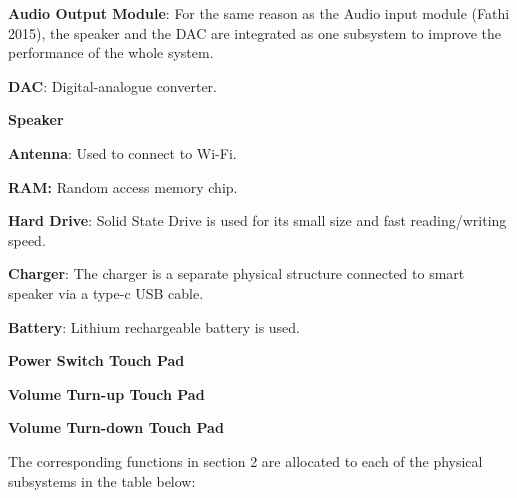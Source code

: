 \documentclass{article}
\begin{document}
\begin{myitems}
\begin{myitems}
\begin{myitems}
  	  \end{myitems}
  	\item \textbf{Audio Output Module}: For the same reason as the Audio input module (Fathi 2015), the speaker and the DAC are integrated as one subsystem to improve the performance of the whole system.
  	\begin{myitems}
  		\item \textbf{DAC}: Digital-analogue converter.
  		\item \textbf{Speaker}
  	\end{myitems}
  	\item \textbf{Antenna}: Used to connect to Wi-Fi.
  	\item \textbf{RAM:} Random access memory chip.
  	\item \textbf{Hard Drive}: Solid State Drive is used for its small size and fast reading/writing speed.
  \end{myitems}
  \item \textbf{Charger}: The charger is a separate physical structure connected to smart speaker via a type-c USB cable.
  \item \textbf{Battery}: Lithium rechargeable battery is used.
  \item \textbf{Power Switch Touch Pad}
  \item \textbf{Volume Turn-up Touch Pad}
  \item \textbf{Volume Turn-down Touch Pad}
\end{myitems}
The corresponding functions in section 2 are allocated to each of the physical subsystems in the table below:
\end{document}

